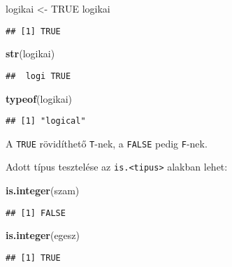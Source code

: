 \documentclass[
]{book}
\newenvironment{Shaded}{\begin{snugshade}}{\end{snugshade}}
\newcommand{\KeywordTok}[1]{\textcolor[rgb]{0.13,0.29,0.53}{\textbf{#1}}}
\newcommand{\NormalTok}[1]{#1}
\newcommand{\OtherTok}[1]{\textcolor[rgb]{0.56,0.35,0.01}{#1}}
\newcommand{\StringTok}[1]{\textcolor[rgb]{0.31,0.60,0.02}{#1}}
\begin{document}
\begin{Shaded}
\begin{Highlighting}[]
\NormalTok{logikai <-}\StringTok{ }\OtherTok{TRUE}
\NormalTok{logikai}
\end{Highlighting}
\end{Shaded}

\begin{verbatim}
## [1] TRUE
\end{verbatim}

\begin{Shaded}
\begin{Highlighting}[]
\KeywordTok{str}\NormalTok{(logikai)}
\end{Highlighting}
\end{Shaded}

\begin{verbatim}
##  logi TRUE
\end{verbatim}

\begin{Shaded}
\begin{Highlighting}[]
\KeywordTok{typeof}\NormalTok{(logikai)}
\end{Highlighting}
\end{Shaded}

\begin{verbatim}
## [1] "logical"
\end{verbatim}

A \texttt{TRUE} rövidíthető \texttt{T}-nek, a \texttt{FALSE} pedig \texttt{F}-nek.

Adott típus tesztelése az \texttt{is.\textless{}tipus\textgreater{}} alakban lehet:

\begin{Shaded}
\begin{Highlighting}[]
\KeywordTok{is.integer}\NormalTok{(szam)}
\end{Highlighting}
\end{Shaded}

\begin{verbatim}
## [1] FALSE
\end{verbatim}

\begin{Shaded}
\begin{Highlighting}[]
\KeywordTok{is.integer}\NormalTok{(egesz)}
\end{Highlighting}
\end{Shaded}

\begin{verbatim}
## [1] TRUE
\end{verbatim}
\end{document}
